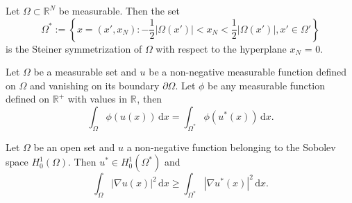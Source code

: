 \begin{definition} \label{steiner}
Let $\Omega \subset \mathbb{R}^{N} $ be measurable.
Then the set 
\[
\Omega^{*} := \left\{ x = (x', x_{N}) : - \frac{1}{2} |\Omega(x')| < x_{N} < \frac{1}{2} |\Omega(x')|, x' \in \Omega' \right\} 
\] 
is the Steiner symmetrization of $\Omega$ with respect to the hyperplane $x_{N}$ = 0.
\end{definition}


\begin{theorem} \label {fk1}
 Let $\Omega$ be a measurable set and $u$ be a non-negative measurable function defined on $\Omega$ and vanishing on its boundary $\partial  \Omega$. 
 Let $\phi$ be any measurable function defined on $\mathbb{R}^{+} $ with values in $\mathbb{R}^{} $, then
 \[
   \int_\Omega \! \phi(u(x)) \, \mathrm{d}x = \int_{\Omega^*} \! \phi(u^*(x)) \, \mathrm{d}x  
 .\] 
\end{theorem}

\begin{theorem} \label{fk2}
  Let $\Omega$ be an open set and $u$ a non-negative function belonging to the Sobolev space $H_{0}^{1}(\Omega)$.
  Then $u^{*} \in H_{0}^{1}(\Omega^{*})$ and 
  \[
    \int_\Omega \! | \nabla u(x)  |^2  \, \mathrm{d}x \geq \int_{\Omega^{*}} \! | \nabla u^{*}(x) |^2 \, \mathrm{d}x 
  .\] 
\end{theorem}

\break
